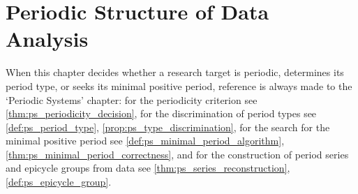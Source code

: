 \chapter{Periodic Structure of Data Analysis}

\begin{remark}\label{rem:data_ps_hook}
When this chapter decides whether a research target is periodic, determines its period type, or seeks its minimal positive period, reference is always made to the `Periodic Systems' chapter:
for the periodicity criterion see \cref{thm:ps_periodicity_decision},
for the discrimination of period types see \cref{def:ps_period_type}, \cref{prop:ps_type_discrimination},
for the search for the minimal positive period see \cref{def:ps_minimal_period_algorithm}, \cref{thm:ps_minimal_period_correctness},
and for the construction of period series and epicycle groups from data see \cref{thm:ps_series_reconstruction}, \cref{def:ps_epicycle_group}.
\end{remark}

